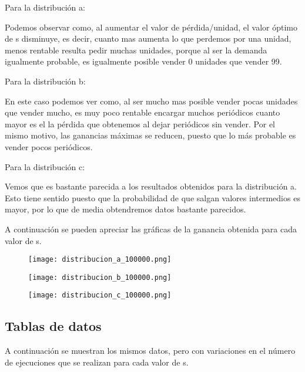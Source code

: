 Para la distribución a:

Podemos observar como, al aumentar el valor de pérdida/unidad, el valor óptimo de s disminuye, es decir, cuanto mas aumenta lo que perdemos por una unidad, menos rentable resulta pedir muchas unidades, porque al ser la demanda igualmente probable, es igualmente posible vender 0 unidades que vender 99.

Para la distribución b:

En este caso podemos ver como, al ser mucho mas posible vender pocas unidades que vender mucho, es muy poco rentable encargar muchos periódicos cuanto mayor es el la pérdida que obtenemos al dejar periódicos sin vender.
Por el mismo motivo, las ganancias máximas se reducen, puesto que lo más probable es vender pocos periódicos.

Para la distribución c:

Vemos que es bastante parecida a los resultados obtenidos para la distribución a. Esto tiene sentido puesto que la probabilidad de que salgan valores intermedios es mayor, por lo que de media obtendremos datos bastante parecidos.

\newpage

A continuación se pueden apreciar las gráficas de la ganancia obtenida para cada valor de s.


\begin{figure}[H]
	\centering
	\texttt{[image: distribucion\_a\_100000.png]}
\end{figure}
\begin{figure}[H]
	\centering
	\texttt{[image: distribucion\_b\_100000.png]}
\end{figure}
\begin{figure}[H]
	\centering
	\texttt{[image: distribucion\_c\_100000.png]}
\end{figure}



\subsection{Tablas de datos}
A continuación se muestran los mismos datos, pero con variaciones en el número de ejecuciones que se realizan para cada valor de s.

